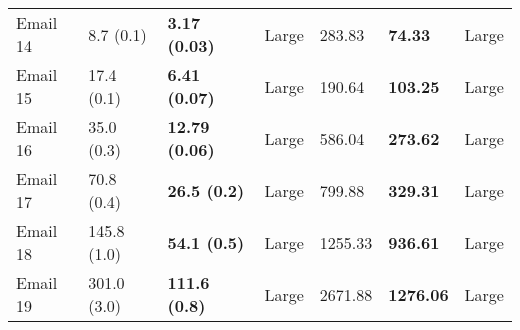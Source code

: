\begin{tabular}{lllllll}
Email 14 &         8.7 (0.1) &  \textbf{3.17 (0.03)} &       Large &                  283.83 &           \textbf{74.33} &       Large \\
Email 15 &        17.4 (0.1) &  \textbf{6.41 (0.07)} &       Large &                  190.64 &          \textbf{103.25} &       Large \\
Email 16 &        35.0 (0.3) & \textbf{12.79 (0.06)} &       Large &                  586.04 &          \textbf{273.62} &       Large \\
Email 17 &        70.8 (0.4) &   \textbf{26.5 (0.2)} &       Large &                  799.88 &          \textbf{329.31} &       Large \\
Email 18 &       145.8 (1.0) &   \textbf{54.1 (0.5)} &       Large &                 1255.33 &          \textbf{936.61} &       Large \\
Email 19 &       301.0 (3.0) &  \textbf{111.6 (0.8)} &       Large &                 2671.88 &         \textbf{1276.06} &       Large \\
\bottomrule
\end{tabular}
